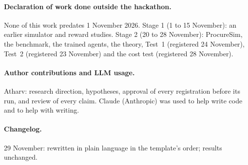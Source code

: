 {\paragraph{Declaration of work done outside the hackathon.} None of this work predates 1 November 2026. Stage 1 (1 to
15 November): an earlier simulator and reward studies. Stage 2 (20 to 28 November): ProcureSim, the benchmark, the
trained agents, the theory, Test~1 (registered 24 November), Test~2 (registered 23 November) and the cost test
(registered 28 November).

\paragraph{Author contributions and LLM usage.} Atharv: research direction, hypotheses, approval of every registration
before its run, and review of every claim. Claude (Anthropic) was used to help write code and to help with writing.

\paragraph{Changelog.} 29 November: rewritten in plain language in the template's order; results unchanged.}
